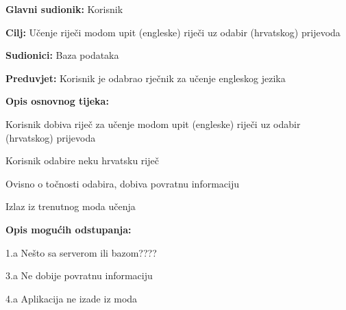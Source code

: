 					\noindent {}
					\begin{packed_item}
						\item \textbf{Glavni sudionik:} Korisnik
						\item \textbf{Cilj:} Učenje riječi modom upit (engleske) riječi uz odabir (hrvatskog) prijevoda
						\item \textbf{Sudionici:} Baza podataka
						\item \textbf{Preduvjet:} Korisnik je odabrao rječnik za učenje engleskog jezika
						\item \textbf{Opis osnovnog tijeka:}
						\begin{packed_enum}
							\item Korisnik dobiva riječ za učenje modom upit (engleske) riječi uz odabir (hrvatskog) prijevoda
							\item Korisnik odabire neku hrvatsku riječ
							\item Ovisno o točnosti odabira, dobiva povratnu informaciju
							\item Izlaz iz trenutnog moda učenja
						\end{packed_enum}
						\item \textbf{Opis mogućih odstupanja:}
						\begin{packed_item}
							\item 1.a Nešto sa serverom ili bazom????
							\item 3.a Ne dobije povratnu informaciju
							\item 4.a Aplikacija ne izade iz moda
						\end{packed_item}
					\end{packed_item}

